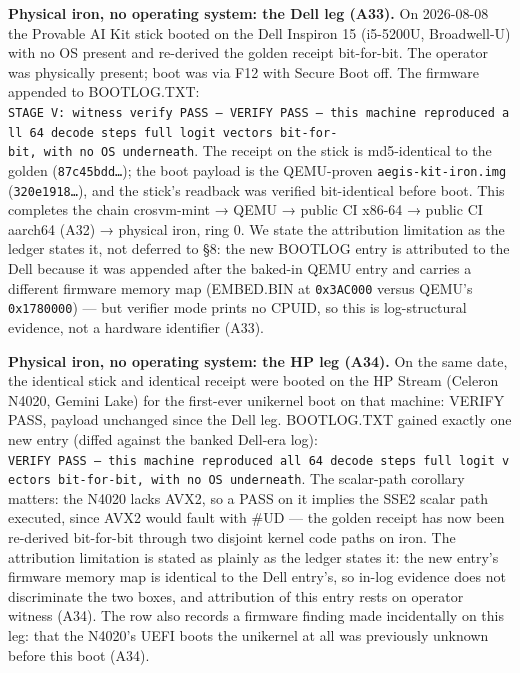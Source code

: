 \documentclass[11pt]{article}
\begin{document}
\textbf{Physical iron, no operating system: the Dell leg (A33).} On 2026-08-08 the Provable AI Kit
stick booted on the Dell Inspiron 15 (i5-5200U, Broadwell-U) with no OS present and re-derived
the golden receipt bit-for-bit. The operator was physically present; boot was via F12 with
Secure Boot off. The firmware appended to BOOTLOG.TXT: \texttt{STAGE\ V:\ witness\ verify\ PASS\ —\ VERIFY\ PASS\ —\ this\ machine\ reproduced\ all\ 64\ decode\ steps\textquotesingle{}\ full\ logit\ vectors\ bit-for-bit,\ with\ no\ OS\ underneath}. The receipt on the stick is md5-identical to the golden (\texttt{87c45bdd…}); the boot
payload is the QEMU-proven \texttt{aegis-kit-iron.img} (\texttt{320e1918…}), and the stick's readback was
verified bit-identical before boot. This completes the chain crosvm-mint → QEMU → public CI
x86-64 → public CI aarch64 (A32) → physical iron, ring 0. We state the attribution limitation as
the ledger states it, not deferred to §8: the new BOOTLOG entry is attributed to the Dell because
it was appended after the baked-in QEMU entry and carries a different firmware memory map
(EMBED.BIN at \texttt{0x3AC000} versus QEMU's \texttt{0x1780000}) --- but verifier mode prints no CPUID, so this
is log-structural evidence, not a hardware identifier (A33).

\textbf{Physical iron, no operating system: the HP leg (A34).} On the same date, the identical stick
and identical receipt were booted on the HP Stream (Celeron N4020, Gemini Lake) for the
first-ever unikernel boot on that machine: VERIFY PASS, payload unchanged since the Dell leg.
BOOTLOG.TXT gained exactly one new entry (diffed against the banked Dell-era log): \texttt{VERIFY\ PASS\ —\ this\ machine\ reproduced\ all\ 64\ decode\ steps\textquotesingle{}\ full\ logit\ vectors\ bit-for-bit,\ with\ no\ OS\ underneath}. The scalar-path corollary matters: the N4020 lacks AVX2, so a PASS on it implies the
SSE2 scalar path executed, since AVX2 would fault with \#UD --- the golden receipt has now been
re-derived bit-for-bit through two disjoint kernel code paths on iron. The attribution limitation
is stated as plainly as the ledger states it: the new entry's firmware memory map is identical to
the Dell entry's, so in-log evidence does not discriminate the two boxes, and attribution of this
entry rests on operator witness (A34). The row also records a firmware finding made incidentally
on this leg: that the N4020's UEFI boots the unikernel at all was previously unknown before this
boot (A34).
\end{document}
